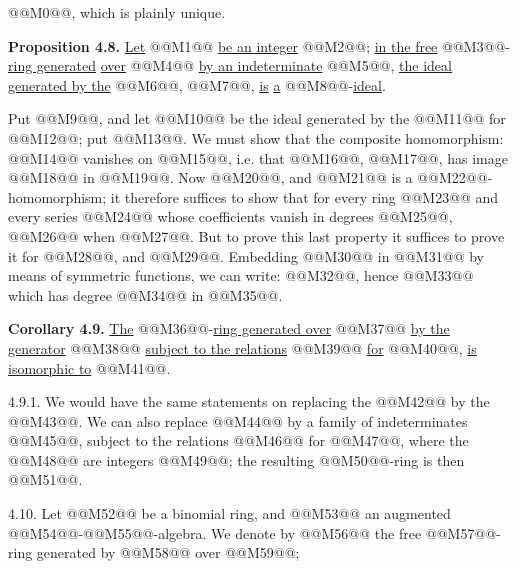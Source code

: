 @@M0@@, which is plainly unique.

\textbf{Proposition 4.8.} \uline{Let} @@M1@@ \uline{be an integer} @@M2@@; \uline{in the free} @@M3@@-\uline{ring generated} \uline{over} @@M4@@ \uline{by an indeterminate} @@M5@@, \uline{the ideal generated by the} @@M6@@, @@M7@@, \uline{is} \uline{a} @@M8@@-\uline{ideal}.

Put @@M9@@, and let @@M10@@ be the ideal generated by the @@M11@@ for @@M12@@; put @@M13@@. We must show that the composite homomorphism: @@M14@@ vanishes on @@M15@@, i.e. that @@M16@@, @@M17@@, has image @@M18@@ in @@M19@@. Now @@M20@@, and @@M21@@ is a @@M22@@-homomorphism; it therefore suffices to show that for every ring @@M23@@ and every series @@M24@@ whose coefficients vanish in degrees @@M25@@, @@M26@@ when @@M27@@. But to prove this last property it suffices to prove it for @@M28@@, and @@M29@@. Embedding @@M30@@ in @@M31@@ by means of symmetric functions, we can write: @@M32@@, hence
@@M33@@
which has degree @@M34@@ in @@M35@@.

\textbf{Corollary 4.9.} \uline{The} @@M36@@-\uline{ring generated over} @@M37@@ \uline{by the generator} @@M38@@ \uline{subject to the relations} @@M39@@ \uline{for} @@M40@@, \uline{is isomorphic to} @@M41@@.

4.9.1. We would have the same statements on replacing the @@M42@@ by the @@M43@@. We can also replace @@M44@@ by a family of indeterminates @@M45@@, subject to the relations @@M46@@ for @@M47@@, where the @@M48@@ are integers @@M49@@; the resulting @@M50@@-ring is then @@M51@@.

4.10. Let @@M52@@ be a binomial ring, and @@M53@@ an augmented @@M54@@-@@M55@@-algebra. We denote by @@M56@@ the free @@M57@@-ring generated by @@M58@@ over @@M59@@;
